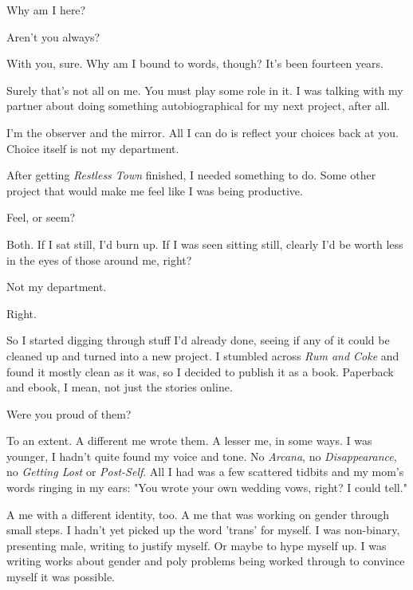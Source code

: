 \label{ally:4}
\begin{paracol}{2}
  \begin{leftcolumn}

\begin{ally}
Why am I here?
\end{ally}
Aren't you always?

\begin{ally}
With you, sure. Why am I bound to words, though? It's been fourteen years.
\end{ally}
Surely that's not all on me. You must play some role in it. I was talking with my partner about doing something autobiographical for my next project, after all.

\begin{ally}
I'm the observer and the mirror. All I can do is reflect your choices back at you. Choice itself is not my department.
\end{ally}
After getting \emph{Restless Town} finished, I needed something to do. Some other project that would make me feel like I was being productive.

\begin{ally}
Feel, or seem?
\end{ally}
Both. If I sat still, I'd burn up. If I was seen sitting still, clearly I'd be worth less in the eyes of those around me, right?

\begin{ally}
Not my department.
\end{ally}
Right.

So I started digging through stuff I'd already done, seeing if any of it could be cleaned up and turned into a new project. I stumbled across \emph{Rum and Coke} and found it mostly clean as it was, so I decided to publish it as a book. Paperback and ebook, I mean, not just the stories online.

\begin{ally}
Were you proud of them?
\end{ally}
To an extent. A different me wrote them. A lesser me, in some ways. I was younger, I hadn't quite found my voice and tone. No \emph{Arcana}, no \emph{Disappearance}, no \emph{Getting Lost} or \emph{Post-Self}. All I had was a few scattered tidbits and my mom's words ringing in my ears: "You wrote your own wedding vows, right? I could tell."

A me with a different identity, too. A me that was working on gender through small steps. I hadn't yet picked up the word 'trans' for myself. I was non-binary, presenting male, writing to justify myself. Or maybe to hype myself up. I was writing works about gender and poly problems being worked through to convince myself it was possible.


\end{leftcolumn}
\end{paracol}
